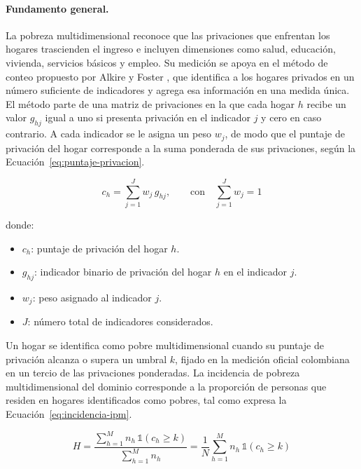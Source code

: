 \paragraph{Fundamento general.}
La pobreza multidimensional reconoce que las privaciones que enfrentan los hogares trascienden el ingreso e incluyen dimensiones como salud, educación, vivienda, servicios básicos y empleo. Su medición se apoya en el método de conteo propuesto por Alkire y Foster \cite{alkire2011}, que identifica a los hogares privados en un número suficiente de indicadores y agrega esa información en una medida única. El método parte de una matriz de privaciones en la que cada hogar $h$ recibe un valor $g_{hj}$ igual a uno si presenta privación en el indicador $j$ y cero en caso contrario. A cada indicador se le asigna un peso $w_j$, de modo que el puntaje de privación del hogar corresponde a la suma ponderada de sus privaciones, según la Ecuación~\ref{eq:puntaje-privacion}.

\begin{equation}
    c_h = \sum_{j=1}^{J} w_j\, g_{hj},
    \qquad \text{con} \quad \sum_{j=1}^{J} w_j = 1
    \label{eq:puntaje-privacion}
\end{equation}

\noindent donde:

\begin{itemize}
    \item $c_h$: puntaje de privación del hogar $h$.
    \item $g_{hj}$: indicador binario de privación del hogar $h$ en el indicador $j$.
    \item $w_j$: peso asignado al indicador $j$.
    \item $J$: número total de indicadores considerados.
\end{itemize}

Un hogar se identifica como pobre multidimensional cuando su puntaje de privación alcanza o supera un umbral $k$, fijado en la medición oficial colombiana en un tercio de las privaciones ponderadas. La incidencia de pobreza multidimensional del dominio corresponde a la proporción de personas que residen en hogares identificados como pobres, tal como expresa la Ecuación~\ref{eq:incidencia-ipm}.

\begin{equation}
    H = \frac{\sum_{h=1}^{M} n_h\, \mathbb{1}(c_h \geq k)}{\sum_{h=1}^{M} n_h} = \frac{1}{N}\sum_{h=1}^{M} n_h\, \mathbb{1}(c_h \geq k)
    \label{eq:incidencia-ipm}
\end{equation}

